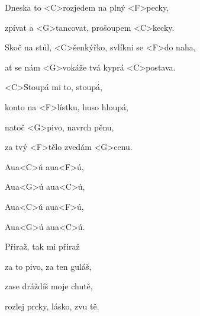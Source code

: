 

\zr
Dneska to <C>rozjedem na plný <F>pecky,

zpívat a <G>tancovat, prošoupem <C>kecky.

Skoč na stůl, <C>šenkýřko, svlíkni se <F>do naha,

ať se nám <G>vokáže tvá kyprá <C>postava.
\kr


\zs
<C>Stoupá mi to, stoupá,

konto na <F>lístku, huso hloupá,

natoč <G>pivo, navrch pěnu,

za tvý <F>tělo zvedám <G>cenu.
\ks

\zr \kr

\zr
Aua<C>ú aua<F>ú,

Aua<G>ú aua<C>ú,



Aua<C>ú aua<F>ú,

Aua<G>ú aua<C>ú.
\kr


\zs
Přiraž, tak mi přiraž

za to pivo, za ten guláš,

zase dráždíš moje chutě,

rozlej prcky, lásko, zvu tě.
\ks


\zr \kr
\zr \kr

\kp
